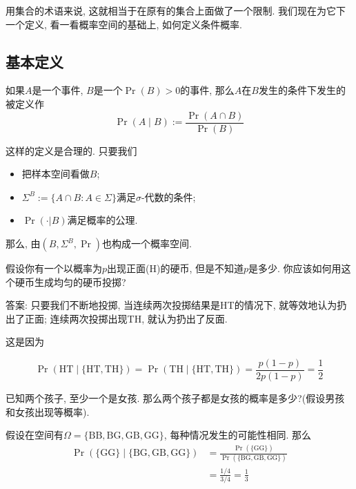 \documentclass{ctexart}
\begin{document}

用集合的术语来说, 这就相当于在原有的集合上面做了一个限制. 我们现在为它下一个定义, 看一看概率空间的基础上, 如何定义条件概率.

\subsection{基本定义}

\begin{definition}
    如果$A$是一个事件, $B$是一个$\Pr(B)>0$的事件, 那么$A$在$B$发生的条件下发生的被定义作
$$\operatorname{Pr}(A \mid B):=\frac{\operatorname{Pr}(A \cap B)}{\operatorname{Pr}(B)}$$
\end{definition}
这样的定义是合理的. 只要我们
\begin{itemize}
    \item 把样本空间看做$B$; 
    \item $\Sigma^B := \{ A \cap B : A \in \Sigma \}$满足$\sigma$-代数的条件;
    \item $\Pr(\cdot|B)$满足概率的公理. 
\end{itemize}
那么, 由$(B,\Sigma^B, \Pr)$也构成一个概率空间. 

\begin{example}
    假设你有一个以概率为$p$出现正面(H)的硬币, 但是不知道$p$是多少. 你应该如何用这个硬币生成均匀的硬币投掷?

    答案: 只要我们不断地投掷, 当连续两次投掷结果是HT的情况下, 就等效地认为扔出了正面; 连续两次投掷出现TH, 就认为扔出了反面. 

    这是因为

$$
\operatorname{Pr}(\mathrm{HT} \mid\{\mathrm{HT}, \mathrm{TH}\})=\operatorname{Pr}(\mathrm{TH} \mid\{\mathrm{HT}, \mathrm{TH}\})=\frac{p(1-p)}{2 p(1-p)}=\frac{1}{2}
$$
\end{example}

\begin{example}
    已知两个孩子, 至少一个是女孩. 那么两个孩子都是女孩的概率是多少?(假设男孩和女孩出现等概率).

    假设在空间有$\Omega=\{\mathrm{BB}, \mathrm{BG}, \mathrm{GB}, \mathrm{GG}\}$, 每种情况发生的可能性相同. 那么
$$
\begin{aligned}
\operatorname{Pr}(\{\mathrm{GG}\} \mid\{\mathrm{BG}, \mathrm{GB}, \mathrm{GG}\}) & =\frac{\operatorname{Pr}(\{\mathrm{GG}\})}{\operatorname{Pr}(\{\mathrm{BG}, \mathrm{GB}, \mathrm{GG}\})} \\
& =\frac{1 / 4}{3 / 4}=\frac{1}{3}
\end{aligned}
$$



\end{example}
\end{document}
